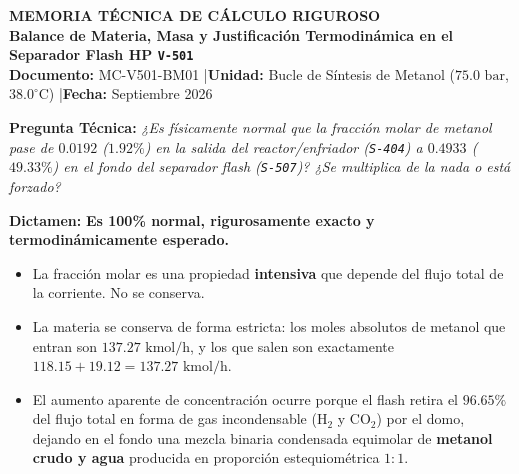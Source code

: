 \documentclass[11pt,letterpaper]{article}
\begin{document}
\begin{tcolorbox}[colback=navyblue,colframe=navyblue,arc=2mm,coltext=white,boxrule=0pt]
\begin{center}
    {\Large \textbf{MEMORIA TÉCNICA DE CÁLCULO RIGUROSO}}\\[3pt]
    {\large \textbf{Balance de Materia, Masa y Justificación Termodinámica en el Separador Flash HP \texttt{V-501}}}\\[4pt]
    \small \textbf{Documento:} MC-V501-BM01 \quad|\quad \textbf{Unidad:} Bucle de Síntesis de Metanol ($75.0\text{ bar}$, $38.0^\circ\text{C}$) \quad|\quad \textbf{Fecha:} Septiembre 2026
\end{center}
\end{tcolorbox}

\vspace{0.2cm}

\begin{tcolorbox}[colback=calloutblue,colframe=borderblue,arc=1mm,title=\textbf{\color{navyblue}Resumen Ejecutivo y Dictamen Físico-Químico},coltitle=navyblue]
\small
\textbf{Pregunta Técnica:} \textit{¿Es físicamente normal que la fracción molar de metanol pase de $0.0192$ ($1.92\%$) en la salida del reactor/enfriador (\texttt{S-404}) a $0.4933$ ($49.33\%$) en el fondo del separador flash (\texttt{S-507})? ¿Se multiplica de la nada o está forzado?}

\vspace{2pt}
\textbf{Dictamen:} \textbf{Es 100\% normal, rigurosamente exacto y termodinámicamente esperado.} 
\begin{itemize}
    \item La fracción molar es una propiedad \textbf{intensiva} que depende del flujo total de la corriente. No se conserva.
    \item La materia se conserva de forma estricta: los moles absolutos de metanol que entran son \textbf{$137.27\text{ kmol/h}$}, y los que salen son exactamente \textbf{$118.15 + 19.12 = 137.27\text{ kmol/h}$}.
    \item El aumento aparente de concentración ocurre porque el flash retira el \textbf{$96.65\%$} del flujo total en forma de gas incondensable ($\text{H}_2$ y $\text{CO}_2$) por el domo, dejando en el fondo una mezcla binaria condensada equimolar de \textbf{metanol crudo y agua} producida en proporción estequiométrica $1:1$.
\end{itemize}
\end{tcolorbox}
\end{document}
